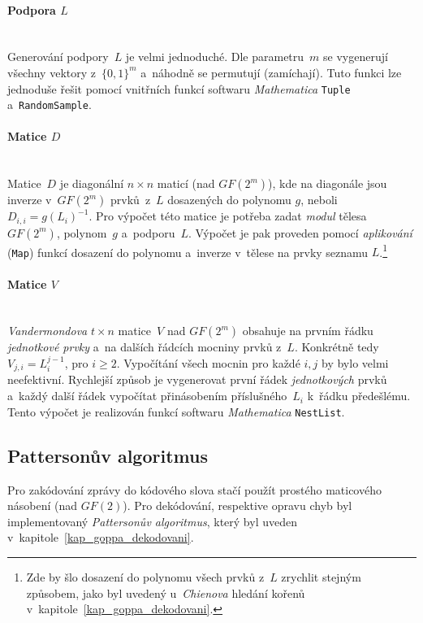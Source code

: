 \documentclass[thesis=M,czech,hidelinks]{FITthesis}[2012/06/26]
\newcommand{\0}{{\textcolor[gray]{0.75}{0}}}
\begin{document}
\paragraph{Podpora $L$} \hfil \\
Generování podpory~$L$ je velmi jednoduché. Dle parametru~$m$ se vygenerují
všechny vektory z~$\{0,1\}^m$ a~náhodně se permutují (zamíchají). Tuto funkci
lze jednoduše řešit pomocí vnitřních funkcí softwaru \emph{Mathematica}
\texttt{Tuple} a~\texttt{Ran\-domSample}.


\paragraph{Matice $D$} \hfil \\
Matice~$D$ je diagonální $n \times n$ maticí (nad $GF(2^m)$), kde na diagonále
jsou inverze v~$GF(2^m)$ prvků~z~$L$ dosazených do polynomu $g$, neboli
$D_{i,i} = g(L_i)^{-1}$. Pro výpočet této matice je potřeba zadat \emph{modul}
tělesa $GF(2^m)$, polynom~$g$ a~podporu~$L$. Výpočet je pak proveden pomocí
\emph{aplikování} (\texttt{Map}) funkcí dosazení do polynomu a~inverze v~tělese
na prvky seznamu $L$.\footnote{
    Zde by šlo dosazení do polynomu všech prvků z~$L$ zrychlit stejným způsobem,
    jako byl uvedený u~\emph{Chienova} hledání kořenů
    v~kapitole~\ref{kap_goppa_dekodovani}.
}


\paragraph{Matice $V$} \hfil \\
\emph{Vandermondova} $t \times n$ matice~$V$ nad $GF(2^m)$ obsahuje na prvním
řádku \emph{jednotkové prvky} a~na dalších řádcích mocniny prvků z~$L$.
Konkrétně tedy $V_{j,i} = L_i^{j-1}$, pro $i\geq 2$. Vypočítání všech mocnin
pro každé $i,j$ by bylo velmi neefektivní. Rychlejší způsob je vygenerovat první
řádek \emph{jednotkových} prvků a~každý další řádek vypočítat přinásobením
příslušného~$L_i$ k~řádku předešlému. Tento výpočet je realizován funkcí
softwaru \emph{Mathematica} \texttt{NestList}.


\subsection{Pattersonův algoritmus}\label{kap_patterson}

Pro zakódování zprávy do kódového slova stačí použít prostého maticového
násobení (nad $GF(2)$). Pro dekódování, respektive opravu chyb byl
implementovaný \emph{Pattersonův algoritmus}, který byl uveden
v~kapitole~\ref{kap_goppa_dekodovani}.
\end{document}
